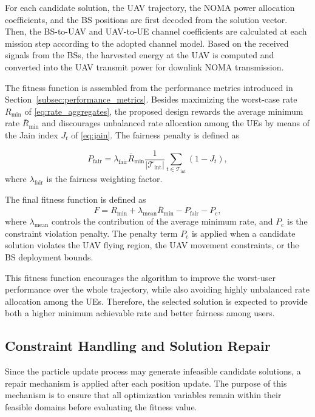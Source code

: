 \documentclass[conference]{IEEEtran}
\begin{document}
For each candidate solution, the UAV trajectory, the NOMA power allocation coefficients, and the BS positions are first decoded from the solution vector. Then, the BS-to-UAV and UAV-to-UE channel coefficients are calculated at each mission step according to the adopted channel model. Based on the received signals from the BSs, the harvested energy at the UAV is computed and converted into the UAV transmit power for downlink NOMA transmission.

The fitness function is assembled from the performance metrics introduced in Section~\ref{subsec:performance_metrics}. Besides maximizing the worst-case rate $R_{\min}$ of \eqref{eq:rate_aggregates}, the proposed design rewards the average minimum rate $\bar{R}_{\min}$ and discourages unbalanced rate allocation among the UEs by means of the Jain index $J_t$ of \eqref{eq:jain}. The fairness penalty is defined as

\begin{equation}
P_{\mathrm{fair}}
=
\lambda_{\mathrm{fair}}
\bar{R}_{\min}
\frac{1}{|\mathcal{T}_{\mathrm{int}}|}
\sum_{t \in \mathcal{T}_{\mathrm{int}}}
(1-J_t),
\end{equation}
where $\lambda_{\mathrm{fair}}$ is the fairness weighting factor.

The final fitness function is defined as
\begin{equation}
F
=
R_{\min}
+
\lambda_{\mathrm{mean}}
\bar{R}_{\min}
-
P_{\mathrm{fair}}
-
P_{\mathrm{c}},
\end{equation}
where $\lambda_{\mathrm{mean}}$ controls the contribution of the average minimum rate, and $P_{\mathrm{c}}$ is the constraint violation penalty. The penalty term $P_{\mathrm{c}}$ is applied when a candidate solution violates the UAV flying region, the UAV movement constraints, or the BS deployment bounds.

This fitness function encourages the algorithm to improve the worst-user performance over the whole trajectory, while also avoiding highly unbalanced rate allocation among the UEs. Therefore, the selected solution is expected to provide both a higher minimum achievable rate and better fairness among users.
\subsection{Constraint Handling and Solution Repair}
\label{subsec:constraint_handling}

Since the particle update process may generate infeasible candidate solutions, a repair mechanism is applied after each position update. The purpose of this mechanism is to ensure that all optimization variables remain within their feasible domains before evaluating the fitness value.
\end{document}
